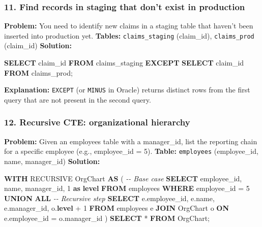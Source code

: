 \documentclass[
  11pt,
  openany,
  oneside]{book}
\newenvironment{Shaded}{}{}
\newcommand{\CommentTok}[1]{\textcolor[rgb]{0.38,0.63,0.69}{\textit{#1}}}
\newcommand{\DecValTok}[1]{\textcolor[rgb]{0.25,0.63,0.44}{#1}}
\newcommand{\KeywordTok}[1]{\textcolor[rgb]{0.00,0.44,0.13}{\textbf{#1}}}
\newcommand{\NormalTok}[1]{#1}
\newcommand{\OperatorTok}[1]{\textcolor[rgb]{0.40,0.40,0.40}{#1}}
\begin{document}
\subsubsection{11. Find records in staging that don't exist in
production}\label{find-records-in-staging-that-dont-exist-in-production}

\textbf{Problem:} You need to identify new claims in a staging table
that haven't been inserted into production yet. \textbf{Tables:}
\texttt{claims\_staging} (claim\_id), \texttt{claims\_prod} (claim\_id)
\textbf{Solution:}

\begin{Shaded}
\begin{Highlighting}[]
\KeywordTok{SELECT}\NormalTok{ claim\_id }\KeywordTok{FROM}\NormalTok{ claims\_staging}
\KeywordTok{EXCEPT}
\KeywordTok{SELECT}\NormalTok{ claim\_id }\KeywordTok{FROM}\NormalTok{ claims\_prod;}
\end{Highlighting}
\end{Shaded}

\textbf{Explanation:} \texttt{EXCEPT} (or \texttt{MINUS} in Oracle)
returns distinct rows from the first query that are not present in the
second query.

\subsubsection{12. Recursive CTE: organizational
hierarchy}\label{recursive-cte-organizational-hierarchy}

\textbf{Problem:} Given an employees table with a manager\_id, list the
reporting chain for a specific employee (e.g., employee\_id = 5).
\textbf{Table:} \texttt{employees} (employee\_id, name, manager\_id)
\textbf{Solution:}

\begin{Shaded}
\begin{Highlighting}[]
\KeywordTok{WITH}\NormalTok{ RECURSIVE OrgChart }\KeywordTok{AS}\NormalTok{ (}
    \CommentTok{{-}{-} Base case}
    \KeywordTok{SELECT}\NormalTok{ employee\_id, name, manager\_id, }\DecValTok{1} \KeywordTok{as} \KeywordTok{level}
    \KeywordTok{FROM}\NormalTok{ employees }\KeywordTok{WHERE}\NormalTok{ employee\_id }\OperatorTok{=} \DecValTok{5}
    \KeywordTok{UNION} \KeywordTok{ALL}
    \CommentTok{{-}{-} Recursive step}
    \KeywordTok{SELECT}\NormalTok{ e.employee\_id, e.name, e.manager\_id, o.}\KeywordTok{level} \OperatorTok{+} \DecValTok{1}
    \KeywordTok{FROM}\NormalTok{ employees e}
    \KeywordTok{JOIN}\NormalTok{ OrgChart o }\KeywordTok{ON}\NormalTok{ e.employee\_id }\OperatorTok{=}\NormalTok{ o.manager\_id}
\NormalTok{)}
\KeywordTok{SELECT} \OperatorTok{*} \KeywordTok{FROM}\NormalTok{ OrgChart;}
\end{Highlighting}
\end{Shaded}
\end{document}
